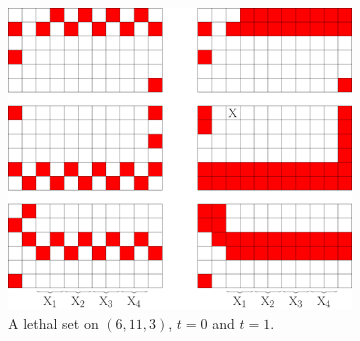 \begin{figure}[]
\centering
\begin{subfigure}[t]{0.65\textwidth}
\centering
\includegraphics[width=\textwidth]{figures/7/6x11x3.pdf}
\caption{A lethal set on $(6,11,3)$, $t=0$ and $t=1$.}
\label{fig:6x11x3}	
\end{subfigure} \hfill%
\begin{subfigure}[t]{0.2915\textwidth}
\centering

\end{subfigure}
\end{figure}

